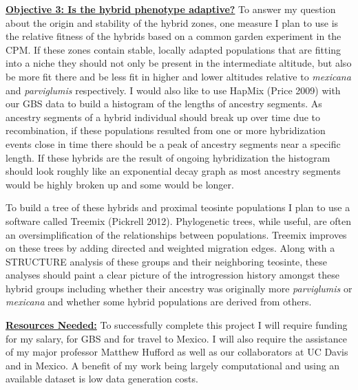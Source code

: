 \documentclass[12pt]{amsart}
\begin{document}
\hfill\break \textbf{\underline{Objective 3: Is the hybrid phenotype adaptive?} }To answer my question about the origin and stability of the hybrid zones, one measure I plan to use is the relative fitness of the hybrids based on a common garden experiment in the CPM. 
If these zones contain stable, locally adapted populations that are fitting into a niche they should not only be present in the intermediate altitude, but also be more fit there and be less fit in higher and lower altitudes relative to \textit{mexicana} and \textit{parviglumis} respectively.
I would also like to use HapMix (Price 2009) with our GBS data to build a histogram of the lengths of ancestry segments.
As ancestry segments of a hybrid individual should break up over time due to recombination, if these populations resulted from one or more hybridization events close in time there should be a peak of ancestry segments near a specific length.
If these hybrids are the result of ongoing hybridization the histogram should look roughly like an exponential decay graph as most ancestry segments would be highly broken up and some would be longer.%

To build a tree of these hybrids and proximal teosinte populations I plan to use a software called Treemix (Pickrell 2012).
Phylogenetic trees, while useful, are often an oversimplification of the relationships between populations. %
Treemix improves on these trees by adding directed and weighted migration edges. %
Along with a STRUCTURE analysis of these groups and their neighboring teosinte, these analyses should paint a clear picture of the introgression history amongst these hybrid groups including whether their ancestry was originally more \textit{parviglumis} or \textit{mexicana} and whether some hybrid populations are derived from others.

\hfill\break \textbf{\underline{Resources Needed:} } To successfully complete this project I will require funding for my salary, for GBS and for travel to Mexico.  I will also require the assistance of my major professor Matthew Hufford as well as our collaborators at UC Davis and in Mexico.
A benefit of my work being largely computational and using an available dataset is low data generation costs.
\end{document}
